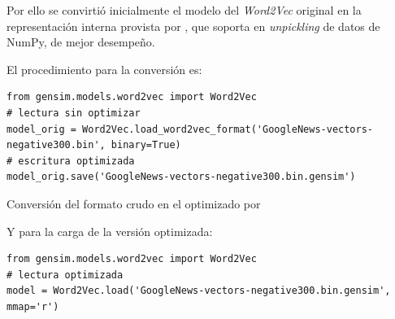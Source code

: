 Por ello se convirtió inicialmente el modelo del \emph{Word2Vec} original en la representación interna provista por , que soporta en \emph{unpickling} de datos de NumPy, de mejor desempeño.

El procedimiento para la conversión es:

\begin{listing}[H]
\begin{verbatim}
from gensim.models.word2vec import Word2Vec
# lectura sin optimizar
model_orig = Word2Vec.load_word2vec_format('GoogleNews-vectors-negative300.bin', binary=True)
# escritura optimizada
model_orig.save('GoogleNews-vectors-negative300.bin.gensim')
\end{verbatim}
\caption{Conversión del formato crudo  en el optimizado por }
\label{lst:word2vec-convert}
\end{listing}

Y para la carga de la versión optimizada:

\begin{verbatim}
from gensim.models.word2vec import Word2Vec
# lectura optimizada
model = Word2Vec.load('GoogleNews-vectors-negative300.bin.gensim', mmap='r')
\end{verbatim}








